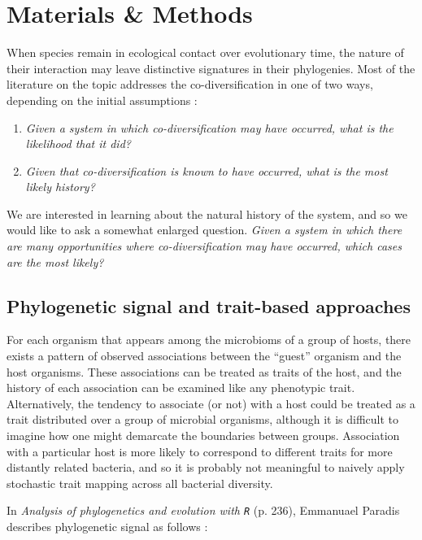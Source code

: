 \section{Materials \& Methods}

When species remain in ecological contact over evolutionary time, the nature of their interaction may leave distinctive signatures in their phylogenies. \cite{bastolla2009architecture} Most of the literature on the topic addresses the co-diversification in one of two ways, depending on the initial assumptions :

\begin{enumerate}
    \item {\em Given a system in which co-diversification may have occurred, what is the likelihood that it did?}

    \item {\em Given that co-diversification is known to have occurred, what is the most likely history?}
\end{enumerate}

We are interested in learning about the natural history of the system, and so we would like to ask a somewhat enlarged question. {\em Given a system in which there are many opportunities where co-diversification may have occurred, which cases are the most likely?} 

\subsection{Phylogenetic signal and trait-based approaches}

For each organism that appears among the microbioms of a group of hosts, there exists a pattern of observed associations between the ``guest'' organism and the host organisms. These associations can be treated as traits of the host, and the history of each association can be examined like any phenotypic trait. Alternatively, the tendency to associate (or not) with a host could be treated as a trait distributed over a group of microbial organisms, although it is difficult to imagine how one might demarcate the boundaries between groups. Association with a particular host is more likely to correspond to different traits for more distantly related bacteria, and so it is probably not meaningful to naively apply stochastic trait mapping across all bacterial diversity.

In {\em Analysis of phylogenetics and evolution with {\tt R}} (p. 236), Emmanuael Paradis describes phylogenetic signal as follows :

